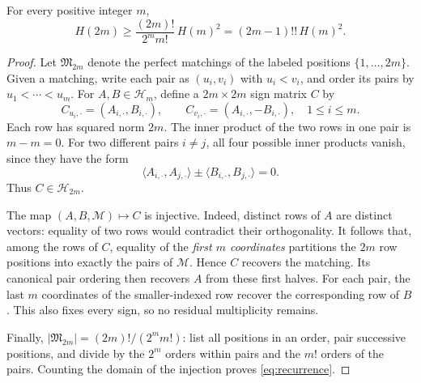\documentclass[11pt,a4paper]{article}
\newcommand{\HH}{\mathcal H}
\begin{document}
\begin{lemma}\label{lem:doubling}
For every positive integer $m$,
\begin{equation}\label{eq:recurrence}
 H(2m)\ge \frac{(2m)!}{2^m m!}\,H(m)^2=(2m-1)!!\,H(m)^2.
\end{equation}
\end{lemma}
\begin{proof}
Let $\mathfrak M_{2m}$ denote the perfect matchings of the labeled positions
$\{1,\ldots,2m\}$. Given a matching, write each pair as $(u_i,v_i)$ with
$u_i<v_i$, and order its pairs by $u_1<\cdots<u_m$.
For $A,B\in\HH_m$, define a $2m\times2m$ sign matrix $C$ by
\begin{equation}\label{eq:construction}
 C_{u_i,\cdot}=(A_{i,\cdot},B_{i,\cdot}),\qquad
 C_{v_i,\cdot}=(A_{i,\cdot},-B_{i,\cdot}),\quad 1\le i\le m.
\end{equation}
Each row has squared norm $2m$. The inner product of the two rows in one
pair is $m-m=0$. For two different pairs $i\ne j$, all four possible inner
products vanish, since they have the form
\[
 \langle A_{i,\cdot},A_{j,\cdot}\rangle
 \mathbin{\pm}\langle B_{i,\cdot},B_{j,\cdot}\rangle=0.
\]
Thus $C\in\HH_{2m}$.

The map $(A,B,\mathcal M)\mapsto C$ is injective. Indeed, distinct rows of
$A$ are distinct vectors: equality of two rows would contradict their
orthogonality. It follows that, among the rows of $C$, equality of the
\emph{first $m$ coordinates} partitions the $2m$ row positions into exactly
the pairs of $\mathcal M$. Hence $C$ recovers the matching. Its canonical
pair ordering then recovers $A$ from these first halves. For each pair,
the last $m$ coordinates of the smaller-indexed row recover the corresponding
row of $B$. This also fixes every sign, so no residual multiplicity remains.

Finally, $|\mathfrak M_{2m}|=(2m)!/(2^m m!)$: list all positions in an order,
pair successive positions, and divide by the $2^m$ orders within pairs and
the $m!$ orders of the pairs. Counting the domain of the injection proves
\eqref{eq:recurrence}.
\end{proof}
\end{document}
